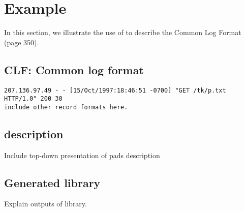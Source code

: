 \chapter{Example}
\label{chap:example}
In this section, we illustrate the use of \pads{} to describe the
Common Log Format \cite{bala} (page 350). 

\section{CLF: Common log format}
\label{sec:example:common-log-format}
\begin{verbatim}
207.136.97.49 - - [15/Oct/1997:18:46:51 -0700] "GET /tk/p.txt HTTP/1.0" 200 30
include other record formats here.
\end{verbatim}

\section{\padsl{} description}
\label{sec:example:padsl-description}
Include top-down presentation of pads description

\section{Generated library}
\label{sec:example:generated-library}
Explain outputs of library.